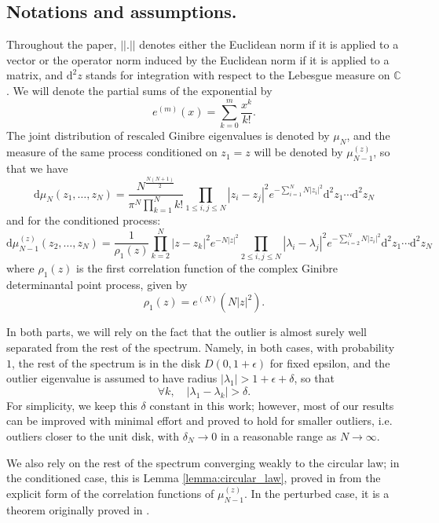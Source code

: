 \documentclass[12pt,a4paper]{amsart}
\theoremstyle{plain} %
\newcommand{\CC}{\mathbb{C}}
\renewcommand{\dd}{\mathrm{d}}
\newcommand{\la}{\lambda}
\newcommand{\beq}{\begin{equation}}
\newcommand{\eeq}{\end{equation}}
\begin{document}
\subsection{Notations and assumptions.} Throughout the paper, $\lvert \lvert . \lvert \lvert$ denotes either the Euclidean norm if it is applied to a vector or the operator norm induced by the Euclidean norm if it is applied to a matrix, and $\dd^2 z $ stands for integration with respect to the Lebesgue measure on $\CC$. We will denote the partial sums of the exponential by
$$
e^{(m)} (x) = \sum_{k=0}^m \frac{x^k}{k!}.
$$
The joint distribution of rescaled Ginibre eigenvalues is denoted by $\mu_N$, and the measure of the same process conditioned on $z_1 = z$ will be denoted by $\mu_{N-1}^{(z)}$, so that we have
\begin{equation}\label{joint_density_1}
    \dd \mu_N(z_1, \dots, z_N) = \frac{N^{\frac{N(N+1)}{2}}}{ \pi^N \prod_{k=1}^N k!} \prod_{1 \leq i,j \leq N} |z_i - z_j|^2 e^{-\sum_{i=1}^N N |z_i|^2} \dd^2 z_1 \cdots  \dd^2 z_N
\end{equation}
and for the conditioned process:
\begin{equation}\label{joint_density_2}
    \dd \mu_{N-1}^{(z)}(z_2, \dots, z_N) = \frac{1}{\rho_1(z)} \prod_{k=2}^N |z-z_k|^2  e^{- N |z|^2} \prod_{2 \leq i,j \leq N} |\la_i - \la_j|^2 e^{-\sum_{i=2}^N N |z_i|^2} \dd^2 z_1 \cdots  \dd^2 z_N
\end{equation}
where $\rho_1(z)$ is the first correlation function of the complex Ginibre determinantal point process, given by
$$
\rho_1(z) = e^{(N)} (N|z|^2).
$$

In both parts, we will rely on the fact that the outlier is almost surely well separated from the rest of the spectrum. Namely, in both cases, with probability $1$, the rest of the spectrum is in the disk $D(0,1+\epsilon)$ for fixed epsilon, and the outlier eigenvalue is assumed to have radius $|\la_1|> 1+ \epsilon + \delta$, so that
\beq\label{delta_distance}
\forall k, \quad |\la_1 - \la_k| > \delta.
\eeq
For simplicity, we keep this $\delta$ constant in this work; however, most of our results can be improved with minimal effort and proved to hold for smaller outliers, i.e. outliers closer to the unit disk, with $\delta_N \rightarrow 0$ in a reasonable range as $N \rightarrow \infty$.

We also rely on the rest of the spectrum converging weakly to the circular law; in the conditioned case, this is Lemma \ref{lemma:circular_law}, proved in \cite{Thomas2026} from the explicit form of the correlation functions of $\mu_{N-1}^{(z)}$. In the perturbed case, it is a theorem originally proved in \cite{Chafai}.
\end{document}
